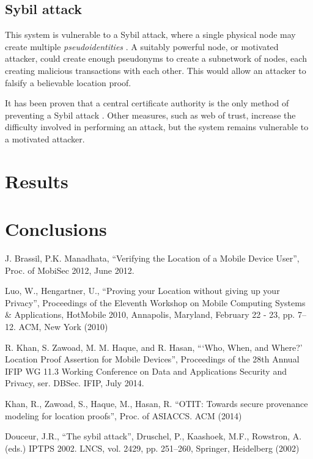 \documentclass[12pt]{article}
\begin{document}
\subsection{Sybil attack}
This system is vulnerable to a Sybil attack, where a single physical node may create multiple \textit{pseudoidentities} \cite{sybil}. A suitably powerful node, or motivated attacker, could create enough pseudonyms to create a subnetwork of nodes, each creating malicious transactions with each other. This would allow an attacker to falsify a believable location proof.

It has been proven that a central certificate authority is the only method of preventing a Sybil attack \cite{sybil}. Other measures, such as web of trust, increase the difficulty involved in performing an attack, but the system remains vulnerable to a motivated attacker.

\section{Results}

\section{Conclusions}

\begin{thebibliography}{9}

  J. Brassil, P.K. Manadhata,
  ``Verifying the Location of a Mobile Device User'',
  Proc. of MobiSec 2012,
  June 2012.

  Luo, W., Hengartner, U.,
  ``Proving your Location without giving up your Privacy'',
  Proceedings of the Eleventh Workshop on Mobile Computing Systems \& Applications,
  HotMobile 2010, Annapolis, Maryland, February 22 - 23, pp. 7–12. ACM,
  New York (2010)

  R. Khan, S. Zawoad, M. M. Haque, and R. Hasan,
  ```Who, When, and Where?' Location Proof Assertion for Mobile Devices'',
  Proceedings of the 28th Annual IFIP WG 11.3 Working Conference on Data and Applications Security and Privacy, ser. DBSec. IFIP,
  July 2014.
 
  Khan, R., Zawoad, S., Haque, M., Hasan, R.
  ``OTIT: Towards secure provenance modeling for location proofs'',
  Proc. of ASIACCS. ACM (2014)

  Douceur, J.R.,
  ``The sybil attack'',
  Druschel, P., Kaashoek, M.F., Rowstron, A. (eds.) IPTPS 2002. LNCS, vol. 2429, pp. 251–260,
  Springer, Heidelberg (2002)

\end{thebibliography}
\end{document}
